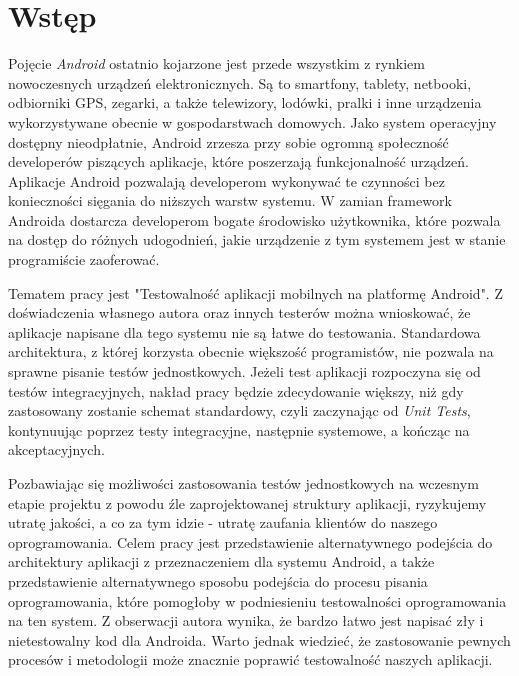 \chapter{Wstęp}
\label{wstep}

Pojęcie \textit{Android} ostatnio kojarzone jest przede wszystkim z rynkiem nowoczesnych urządzeń elektronicznych. Są to smartfony, tablety, netbooki, odbiorniki GPS, zegarki, a także telewizory, lodówki, pralki i inne urządzenia wykorzystywane obecnie w gospodarstwach domowych. Jako system operacyjny dostępny nieodpłatnie, Android zrzesza przy sobie ogromną społeczność developerów piszących aplikacje, które poszerzają funkcjonalność urządzeń.  Aplikacje Android pozwalają developerom wykonywać te czynności bez konieczności sięgania do niższych warstw systemu. W zamian framework Androida dostarcza developerom bogate środowisko użytkownika, które pozwala na dostęp do różnych udogodnień, jakie urządzenie z tym systemem jest w stanie programiście zaoferować. 

Tematem pracy jest "Testowalność aplikacji mobilnych na platformę Android". Z doświadczenia własnego autora oraz innych testerów można wnioskować, że aplikacje napisane dla tego systemu nie są łatwe do testowania. Standardowa architektura, z której korzysta obecnie większość programistów, nie pozwala na sprawne pisanie testów jednostkowych. Jeżeli test aplikacji rozpoczyna się od testów integracyjnych, nakład pracy będzie zdecydowanie większy, niż gdy zastosowany zostanie schemat standardowy, czyli zaczynając od \textit{Unit Tests}, kontynuując poprzez testy integracyjne, następnie systemowe, a kończąc na akceptacyjnych. 

Pozbawiając się możliwości zastosowania testów jednostkowych na wczesnym etapie projektu z powodu źle zaprojektowanej struktury aplikacji, ryzykujemy utratę jakości, a co za tym idzie - utratę zaufania klientów do naszego oprogramowania. Celem pracy jest przedstawienie alternatywnego podejścia do architektury aplikacji z przeznaczeniem dla systemu Android, a także przedstawienie alternatywnego sposobu podejścia do procesu pisania oprogramowania, które pomogłoby w podniesieniu testowalności oprogramowania na ten system. Z obserwacji autora wynika, że bardzo łatwo jest napisać zły i nietestowalny kod dla Androida. Warto jednak wiedzieć, że zastosowanie pewnych procesów i metodologii może znacznie poprawić testowalność naszych aplikacji. 

